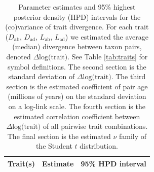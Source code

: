 \documentclass[
  12pt,
]{article}
\begin{document}
\begin{table}[ht]
\caption{\label{tab:h12output} Parameter estimates and 95\% highest posterior density (HPD) intervals for the (co)variance of trait divergence. For each trait ($D_\mathrm{ab}$, $D_\mathrm{ad}$, $L_\mathrm{ab}$, $L_\mathrm{ad}$) we estimated the average (median) divergence between taxon pairs, denoted $\Delta \text{log(trait)}$. See Table \ref{tab:traits} for symbol definitions. The second section is the standard deviation of $\Delta \text{log(trait)}$. The third section is the estimated coefficient of pair age (millions of years) on the standard deviation on a log-link scale. The fourth section is the estimated correlation coefficient between $\Delta \text{log(trait)}$ of all pairwise trait combinations. The final section is the estimated $\nu$ family of the Student $t$ distribution.}
\begin{center}
\begin{tabular}{lll}

  \toprule
  Trait(s) & Estimate & 95\% HPD interval \\
  \midrule
  

\end{tabular}
\end{center}
\end{table}
\end{document}
